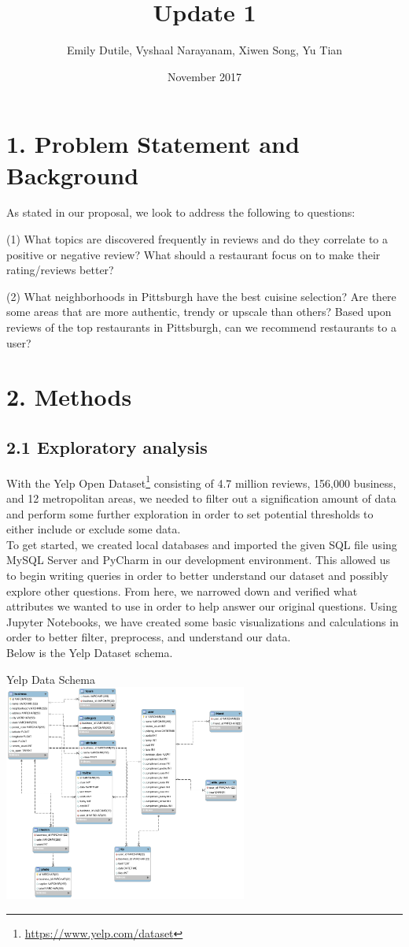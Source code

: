 \documentclass{neu_handout}
\title{Update 1}
\author{Emily Dutile, Vyshaal Narayanam, Xiwen Song, Yu Tian}
\date{November 2017}
\begin{document}
\section*{1. Problem Statement and Background}
As stated in our proposal, we look to address the following to questions:

(1) What topics are discovered frequently in reviews and do they correlate to a positive or negative review? What should a restaurant focus on to make their rating/reviews better?

(2) What neighborhoods in Pittsburgh have the best cuisine selection? Are there some areas that are more authentic, trendy or upscale than others? Based upon reviews of the top restaurants in Pittsburgh, can we recommend restaurants to a user?

\section*{2. Methods}
\subsection*{2.1 Exploratory analysis}
With the Yelp Open Dataset\footnote{\url{https://www.yelp.com/dataset}} consisting of 4.7 million reviews, 156,000 business, and 12 metropolitan areas, we needed to filter out a signification amount of data and perform some further exploration in order to set potential thresholds to either include or exclude some data.\\
To get started, we created local databases and imported the given SQL file using MySQL Server and PyCharm in our development environment. This allowed us to begin writing queries in order to better understand our dataset and possibly explore other questions. From here, we narrowed down and verified what attributes we wanted to use in order to help answer our original questions.  Using Jupyter Notebooks, we have created some basic visualizations and calculations in order to better filter, preprocess, and understand our data.\\

Below is the Yelp Dataset schema.
\begin{center}
Yelp Data Schema\\
\includegraphics[width=80mm,scale=0.5]{schema}\\
\end{center}
\end{document}
